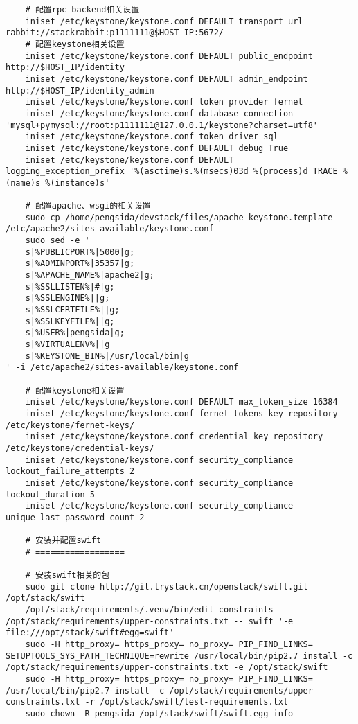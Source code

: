 \documentclass[a4paper,left=1.5cm,right=1.5cm,11pt]{article}
\begin{document}
\begin{lstlisting}
	# 配置rpc-backend相关设置
	iniset /etc/keystone/keystone.conf DEFAULT transport_url rabbit://stackrabbit:p1111111@$HOST_IP:5672/
	# 配置keystone相关设置
	iniset /etc/keystone/keystone.conf DEFAULT public_endpoint http://$HOST_IP/identity
    iniset /etc/keystone/keystone.conf DEFAULT admin_endpoint http://$HOST_IP/identity_admin
	iniset /etc/keystone/keystone.conf token provider fernet
	iniset /etc/keystone/keystone.conf database connection 'mysql+pymysql://root:p1111111@127.0.0.1/keystone?charset=utf8'
    iniset /etc/keystone/keystone.conf token driver sql
	iniset /etc/keystone/keystone.conf DEFAULT debug True
	iniset /etc/keystone/keystone.conf DEFAULT logging_exception_prefix '%(asctime)s.%(msecs)03d %(process)d TRACE %(name)s %(instance)s'

	# 配置apache、wsgi的相关设置
	sudo cp /home/pengsida/devstack/files/apache-keystone.template /etc/apache2/sites-available/keystone.conf
	sudo sed -e '
	s|%PUBLICPORT%|5000|g;
	s|%ADMINPORT%|35357|g;
	s|%APACHE_NAME%|apache2|g;
	s|%SSLLISTEN%|#|g;
	s|%SSLENGINE%||g;
	s|%SSLCERTFILE%||g;
	s|%SSLKEYFILE%||g;
	s|%USER%|pengsida|g;
	s|%VIRTUALENV%||g
	s|%KEYSTONE_BIN%|/usr/local/bin|g
' -i /etc/apache2/sites-available/keystone.conf

	# 配置keystone相关设置
	iniset /etc/keystone/keystone.conf DEFAULT max_token_size 16384
    iniset /etc/keystone/keystone.conf fernet_tokens key_repository /etc/keystone/fernet-keys/
    iniset /etc/keystone/keystone.conf credential key_repository /etc/keystone/credential-keys/
	iniset /etc/keystone/keystone.conf security_compliance lockout_failure_attempts 2
    iniset /etc/keystone/keystone.conf security_compliance lockout_duration 5
    iniset /etc/keystone/keystone.conf security_compliance unique_last_password_count 2

	# 安装并配置swift
	# ==================

	# 安装swift相关的包
	sudo git clone http://git.trystack.cn/openstack/swift.git /opt/stack/swift
	/opt/stack/requirements/.venv/bin/edit-constraints /opt/stack/requirements/upper-constraints.txt -- swift '-e file:///opt/stack/swift#egg=swift'
	sudo -H http_proxy= https_proxy= no_proxy= PIP_FIND_LINKS= SETUPTOOLS_SYS_PATH_TECHNIQUE=rewrite /usr/local/bin/pip2.7 install -c /opt/stack/requirements/upper-constraints.txt -e /opt/stack/swift
	sudo -H http_proxy= https_proxy= no_proxy= PIP_FIND_LINKS= /usr/local/bin/pip2.7 install -c /opt/stack/requirements/upper-constraints.txt -r /opt/stack/swift/test-requirements.txt
	sudo chown -R pengsida /opt/stack/swift/swift.egg-info


\end{lstlisting}
\end{document}
